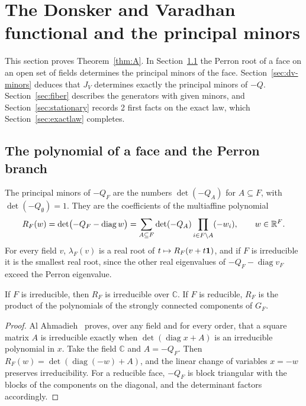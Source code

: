 \section{The Donsker and Varadhan functional and the principal minors}\label{sec:minors}

This section proves Theorem~\ref{thm:A}. In Section~\ref{sec:perron-branch} the Perron
root of a face on an open set of fields determines the principal minors of the face.
Section~\ref{sec:dv-minors} deduces that $J_V$ determines exactly the principal minors of
$-Q$. Section~\ref{sec:fiber} describes the generators with given minors, and
Section~\ref{sec:stationary} records 2 first facts on the exact law, which
Section~\ref{sec:exactlaw} completes.

\subsection{The polynomial of a face and the Perron branch}\label{sec:perron-branch}

The principal minors of $-Q_F$ are the numbers $\det(-Q_A)$ for $A\subseteq F$, with
$\det(-Q_\emptyset)=1$. They are the coefficients of the multiaffine polynomial
\[
 R_F(w)=\det\bigl(-Q_F-\operatorname{diag}w\bigr)
 =\sum_{A\subseteq F}\det(-Q_A)\prod_{i\in F\setminus A}(-w_i),\qquad w\in\mathbb{R}^F .
\]
For every field $v$, $\lambda_F(v)$ is a real root of $t\mapsto R_F(v+t\mathbf{1})$, and if
$F$ is irreducible it is the smallest real root, since the other real eigenvalues of
$-Q_F-\operatorname{diag}v_F$ exceed the Perron eigenvalue.

\begin{lemma}[irreducibility]\label{lem:RF-irreducible}
If $F$ is irreducible, then $R_F$ is irreducible over $\mathbb C$. If $F$ is reducible,
$R_F$ is the product of the polynomials of the strongly connected components of $G_F$.
\end{lemma}

\begin{proof}
Al Ahmadieh~\cite[Lemma~5.1]{alahmadieh2023} proves, over any field and for every
order, that a square matrix $A$ is irreducible exactly when
$\det(\operatorname{diag}x+A)$ is an irreducible polynomial in $x$. Take the field
$\mathbb C$ and $A=-Q_F$. Then $R_F(w)=\det(\operatorname{diag}(-w)+A)$, and the linear
change of variables $x=-w$ preserves irreducibility. For a reducible face, $-Q_F$ is
block triangular with the blocks of the components on the diagonal, and the determinant
factors accordingly.
\end{proof}

